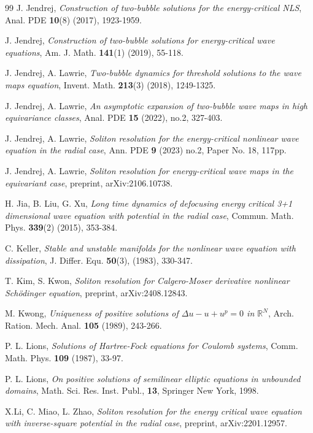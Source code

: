 \documentclass[reqno]{amsart}
\theoremstyle{plain}
\theoremstyle{definition}
\numberwithin{equation}{section}
\newcommand{\1}{\mathbbm{1}}
\begin{document}
\begin{thebibliography}{99}
 J. Jendrej,
\textit{Construction of two-bubble solutions for the energy-critical NLS},
Anal. PDE \textbf{10}(8) (2017), 1923-1959.

 J. Jendrej, 
\textit{Construction of two-bubble solutions for energy-critical wave equations},
Am. J. Math. \textbf{141}(1) (2019), 55-118.


 J. Jendrej, A. Lawrie,
\textit{Two-bubble dynamics for threshold solutions to the wave maps equation},
Invent. Math. \textbf{213}(3) (2018), 1249-1325.


 J. Jendrej, A. Lawrie,
\textit{An asymptotic expansion of two-bubble wave maps in high equivariance classes},
Anal. PDE \textbf{15} (2022), no.2, 327-403.

 J. Jendrej, A. Lawrie,
\textit{Soliton resolution for the energy-critical nonlinear wave equation in the radial case},
Ann. PDE \textbf{9} (2023) no.2, Paper No. 18, 117pp.


 J. Jendrej, A. Lawrie,
\textit{Soliton resolution for energy-critical wave maps in the equivariant case},
preprint, arXiv:2106.10738.

 H. Jia, B. Liu, G. Xu,
\textit{Long time dynamics of defocusing energy critical 3+1 dimensional wave equation with potential in the radial case},
Commun. Math. Phys. \textbf{339}(2) (2015), 353-384.


 C. Keller,
\textit{Stable and unstable manifolds for the nonlinear wave equation with dissipation},
J. Differ. Equ. \textbf{50}(3), (1983), 330-347.


 T. Kim, S. Kwon,
\textit{Soliton resolution for Calgero-Moser derivative nonlinear Sch\"{o}dinger equation},
preprint, arXiv:2408.12843.

 M. Kwong,
\textit{ Uniqueness of positive solutions of $\Delta u-u+u^p=0$ in ${\mathbb{R}}^N$},
Arch. Ration. Mech. Anal. \textbf{105} (1989), 243-266.


 P. L. Lions, 
\textit{Solutions of Hartree-Fock equations for Coulomb systems},
Comm. Math. Phys. \textbf{109} (1987), 33-97.


 P. L. Lions,
\textit{On positive solutions of semilinear elliptic equations in unbounded domains},
Math. Sci. Res. Inst. Publ., \textbf{13}, Springer New York, 1998.


 X.Li, C. Miao, L. Zhao,
\textit{Soliton resolution for the energy critical wave equation with inverse-square potential in the radial case},
preprint, arXiv:2201.12957.




\end{thebibliography}
\end{document}
